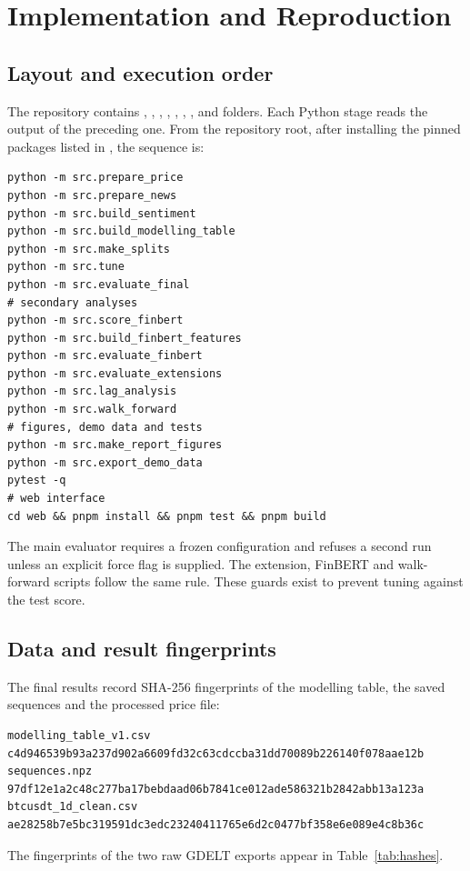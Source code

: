 \section{Implementation and Reproduction}
\label{app:repro}
\subsection{Layout and execution order}
The repository contains , , , , , , ,  and  folders. Each Python stage reads the output of the preceding one. From the repository root, after installing the pinned packages listed in , the sequence is:

\begin{lstlisting}[basicstyle=\ttfamily\footnotesize,backgroundcolor=\color{codegray},breaklines=true,frame=single]
python -m src.prepare_price
python -m src.prepare_news
python -m src.build_sentiment
python -m src.build_modelling_table
python -m src.make_splits
python -m src.tune
python -m src.evaluate_final
# secondary analyses
python -m src.score_finbert
python -m src.build_finbert_features
python -m src.evaluate_finbert
python -m src.evaluate_extensions
python -m src.lag_analysis
python -m src.walk_forward
# figures, demo data and tests
python -m src.make_report_figures
python -m src.export_demo_data
pytest -q
# web interface
cd web && pnpm install && pnpm test && pnpm build
\end{lstlisting}

The main evaluator requires a frozen configuration and refuses a second run unless an explicit force flag is supplied. The extension, FinBERT and walk-forward scripts follow the same rule. These guards exist to prevent tuning against the test score.

\subsection{Data and result fingerprints}
The final results record SHA-256 fingerprints of the modelling table, the saved sequences and the processed price file:
\begin{lstlisting}[basicstyle=\ttfamily\footnotesize,backgroundcolor=\color{codegray},breaklines=true,frame=single]
modelling_table_v1.csv
c4d946539b93a237d902a6609fd32c63cdccba31dd70089b226140f078aae12b
sequences.npz
97df12e1a2c48c277ba17bebdaad06b7841ce012ade586321b2842abb13a123a
btcusdt_1d_clean.csv
ae28258b7e5bc319591dc3edc23240411765e6d2c0477bf358e6e089e4c8b36c
\end{lstlisting}
The fingerprints of the two raw GDELT exports appear in Table~\ref{tab:hashes}.

